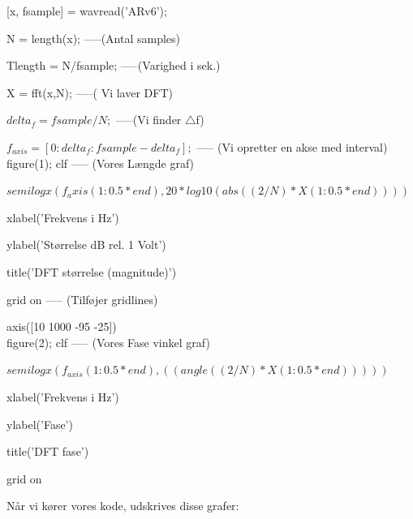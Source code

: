 \documentclass[12pt, letterpaper]{article}
\begin{document}
[x, fsample] = wavread('ARv6');

N = length(x);       -----(Antal samples)
     
Tlength = N/fsample;     -----(Varighed i sek.)              

X = fft(x,N);   -----( Vi laver DFT)                       

$delta_f = fsample/N;$  -----(Vi finder $\bigtriangleup$f)

$f_{axis} = [0:delta_f:fsample-delta_f];$ ----- (Vi opretter en akse med interval)\\

figure(1); clf  ----- (Vores Længde graf)  
     
$semilogx(f_axis(1:0.5*end), 20*log10(abs((2/N)*X(1:0.5*end))))$

xlabel('Frekvens i Hz')

ylabel('Størrelse dB rel. 1 Volt') 

title('DFT størrelse (magnitude)')

grid on       -----   (Tilføjer gridlines) 
  
axis([10 1000 -95 -25])\\

figure(2); clf 		-----  (Vores Fase vinkel graf)  
                   
$semilogx(f_{axis}(1:0.5*end), ((angle((2/N)*X(1:0.5*end)))))$

xlabel('Frekvens i Hz')

ylabel('Fase')

title('DFT fase')

grid on
\newpage

Når vi kører vores kode, udskrives disse grafer: 
\end{document}
